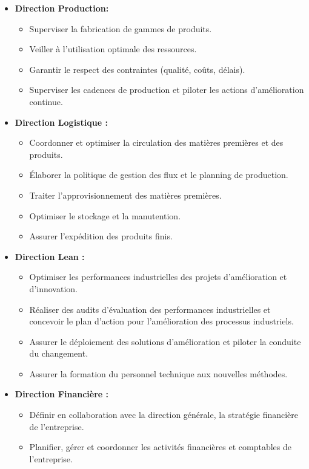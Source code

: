 \begin{itemize}
   
     \item [$-$]\textbf{Direction Production:}
    
    \begin{itemize}[label=\textbullet]
    \item Superviser la fabrication de gammes de produits.
    \item Veiller à l'utilisation optimale des ressources.  
    \item Garantir le respect des contraintes (qualité, coûts, délais). 
    \item Superviser les cadences de production et piloter les actions d'amélioration continue.   
    \end{itemize}

  
    \item [$-$] \textbf{Direction Logistique :}
  
    \begin{itemize}[label=\textbullet,font=\normalsize]
    \item Coordonner et optimiser la circulation des matières premières et des produits.
    \item Élaborer la politique de gestion des flux et le planning de production.   
    \item Traiter l’approvisionnement des matières premières.  
    \item Optimiser le stockage et la manutention. 
    \item Assurer l’expédition des produits finis. 
    \end{itemize}

   
     \item [$-$]\textbf{Direction Lean :}
    
    \begin{itemize}[label=\textbullet,font=\normalsize]
    \item Optimiser les performances industrielles des projets d’amélioration et d’innovation.
    \item Réaliser des audits d’évaluation des performances industrielles et concevoir le plan d’action pour l’amélioration des processus industriels.
    \item Assurer le déploiement des solutions d’amélioration et piloter la conduite du changement.  
    \item Assurer la formation du personnel technique aux nouvelles méthodes. 
    \end{itemize}

  
    \item [$-$] \textbf{Direction Financière :}
    
    \begin{itemize}[label=\textbullet,font=\normalsize]
    \item Définir en collaboration avec la direction générale, la stratégie financière de l'entreprise.
    \item Planifier, gérer et coordonner les activités financières et comptables de l’entreprise.
    \end{itemize}
    
    \end{itemize}
    
